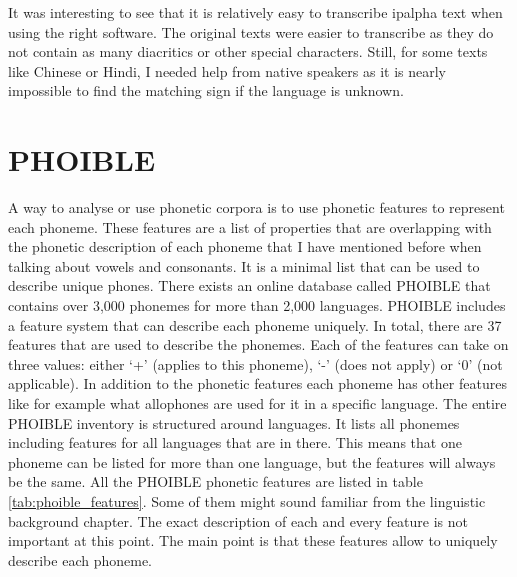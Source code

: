 It was interesting to see that it is relatively easy to transcribe \ac{ipalpha} text when using the right software. The original texts were easier to transcribe as they do not contain as many diacritics or other special characters. Still, for some texts like Chinese or Hindi, I needed help from native speakers as it is nearly impossible to find the matching sign if the language is unknown. 

\section{PHOIBLE}
\label{sec:phoible}
A way to analyse or use phonetic corpora is to use phonetic features to represent each phoneme. These features are a list of properties that are overlapping with the phonetic description of each phoneme that I have mentioned before when talking about vowels and consonants. It is a minimal list that can be used to describe unique phones. There exists an online database called PHOIBLE \citep{phoible} that contains over 3,000 phonemes for more than 2,000 languages. PHOIBLE includes a feature system that can describe each phoneme uniquely. In total, there are 37 features that are used to describe the phonemes. Each of the features can take on three values: either `+' (applies to this phoneme), `-' (does not apply) or `0' (not applicable). In addition to the phonetic features each phoneme has other features like for example what allophones are used for it in a specific language. The entire PHOIBLE inventory is structured around languages. It lists all phonemes including features for all languages that are in there. This means that one phoneme can be listed for more than one language, but the features will always be the same. All the PHOIBLE phonetic features are listed in table \ref{tab:phoible_features}. Some of them might sound familiar from the linguistic background chapter. The exact description of each and every feature is not important at this point. The main point is that these features allow to uniquely describe each phoneme.

